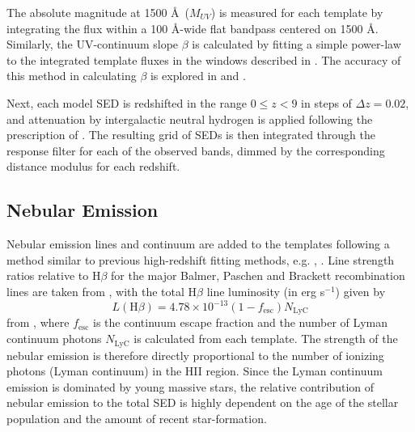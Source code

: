 The absolute magnitude at 1500 \AA ~($M_{UV}$) is measured for each template by integrating the flux within a 100 \AA-wide flat bandpass centered on 1500 \AA. Similarly, the UV-continuum slope $\beta$ is calculated by fitting a simple power-law to the integrated template fluxes in the windows described in \citet{1994ApJ...429..582C}. The accuracy of this method in calculating $\beta$ is explored in \citet{Finkelstein:2012hr} and \citet{2013MNRAS.429.2456R}.

Next, each model SED is redshifted in the range $0 \le z < 9$ in steps of $\Delta z = 0.02$, and attenuation by intergalactic neutral hydrogen is applied following the prescription of \cite{1995ApJ...441...18M}. The resulting grid of SEDs is then integrated through the response filter for each of the observed bands, dimmed by the corresponding distance modulus for each redshift.

\subsection{Nebular Emission}\label{subsection:nebular}
Nebular emission lines and continuum are added to the templates following a method similar to previous high-redshift fitting methods, e.g.  \citet{Ono:2010ed,2010A&A...515A..73S,2011MNRAS.418.2074M}, \citet{Salmon:2014tm}. Line strength ratios relative to H$\beta$ for the major Balmer, Paschen and Brackett recombination lines are taken from \cite{Osterbrock:2006ul}, with the total H$\beta$ line luminosity (in erg s$^{-1}$) given by
\begin{equation}
L(\text{H}\beta) = 4.78 \times10^{-13} (1-f_{\text{esc}}) N_{\text{LyC}}
\end{equation}
from \citet{1995A&A...303...41K}, where $f_{\text{esc}}$ is the continuum escape fraction and the number of Lyman continuum photons $N_{\text{LyC}}$ is calculated from each template. The strength of the nebular emission is therefore directly proportional to the number of ionizing photons (Lyman continuum) in the HII region. Since the Lyman continuum emission is dominated by young massive stars, the relative contribution of nebular emission to the total SED is highly dependent on the age of the stellar population and the amount of recent star-formation.  
 
